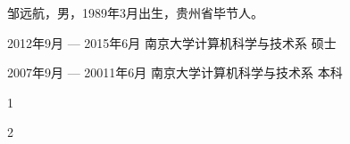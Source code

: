 \documentclass[master]{njuthesis}
\begin{document}
\begin{resume}
\begin{authorinfo}
\noindent 邹远航，男，1989年3月出生，贵州省毕节人。
\end{authorinfo}
\begin{education}
\item[2012年9月 --- 2015年6月] 南京大学计算机科学与技术系 \hfill 硕士
\item[2007年9月 --- 20011年6月] 南京大学计算机科学与技术系 \hfill 本科
\end{education}

\begin{projects}
\item 1
\item 2
\end{projects}
\end{resume}

\makelicense

\end{document}
